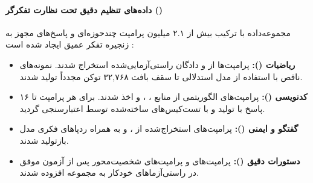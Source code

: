 \paragraph*{داده‌های تنظیم دقیق تحت نظارت تفکرگر ()}
مجموعه‌داده  با ترکیب بیش از ۲.۱ میلیون پرامپت چندحوزه‌ای و پاسخ‌های مجهز به زنجیره تفکر عمیق ایجاد شده است \cite{guha2025openthoughts, primeintellect2025synthetic2}:
\begin{itemize}
    \item \textbf{ریاضیات ():} پرامپت‌ها از  و دادگان راستی‌آزمایی‌شده  استخراج شدند. نمونه‌های ناقص با استفاده از مدل استدلالی  \cite{qwen2025qwq32b} تا سقف بافت ۳۲,۷۶۸ توکن مجدداً تولید شدند.
    \item \textbf{کدنویسی ():} پرامپت‌های الگوریتمی از منابع  \cite{zeng2025acecoder}،  \cite{thealgorithms2025}،  \cite{bercovich2025llamanemotron} و  \cite{ahmad2025opencodereasoning} اخذ شدند. برای هر پرامپت تا ۱۶ پاسخ با  تولید و با تست‌کیس‌های ساخته‌شده توسط  اعتبارسنجی گردید.
    \item \textbf{گفتگو و ایمنی ():} پرامپت‌های استخراج‌شده از  \cite{zhao2024wildchat}،  \cite{kopf2024openassistant} و  \cite{lambert2024tulu3} به همراه ردپاهای فکری مدل  \cite{guo2025deepseekr1} بازتولید شدند.
    \item \textbf{دستورات دقیق ():} پرامپت‌های  \cite{pyatkin2025generalizing} و پرامپت‌های شخصیت‌محور \cite{meyer2025nemotronpersonas} پس از آزمون موفق در راستی‌آزماهای خودکار به مجموعه افزوده شدند.
\end{itemize}

